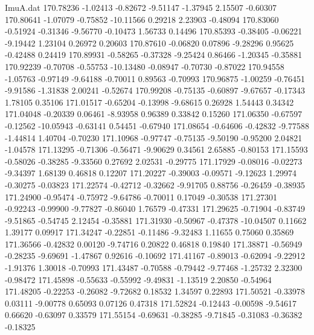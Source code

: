\begin{filecontents}{ImuA.dat}
 170.78236   -1.02413   -0.82672   -9.51147   -1.37945    2.15507   -0.60307
 170.80641   -1.07079   -0.75852  -10.11566    0.29218    2.23903   -0.48094
 170.83060   -0.51924   -0.31346   -9.56770   -0.10473    1.56733    0.14496
 170.85393   -0.38405   -0.06221   -9.19442    1.23104    0.26972    0.20603
 170.87610   -0.06820    0.07896   -9.28296    0.95625   -0.42488    0.24419
 170.89931   -0.58265   -0.37328   -9.25424    0.86466   -1.20345   -0.35881
 170.92239   -0.70708   -0.55753  -10.13480   -0.08947   -0.70730   -0.87022
 170.94558   -1.05763   -0.97149   -9.64188   -0.70011    0.89563   -0.70993
 170.96875   -1.00259   -0.76451   -9.91586   -1.31838    2.00241   -0.52674
 170.99208   -0.75135   -0.60897   -9.67657   -0.17343    1.78105    0.35106
 171.01517   -0.65204   -0.13998   -9.68615    0.26928    1.54443    0.34342
 171.04048   -0.20339    0.06461   -8.93958    0.96389    0.33842    0.15260
 171.06350   -0.67597   -0.12562  -10.05943   -0.63141    0.54451   -0.67940
 171.08654   -0.64606   -0.42832   -9.77588   -1.44814    1.40704   -0.70230
 171.10968   -0.97747   -0.75135   -9.50190   -0.95200    2.04821   -1.04578
 171.13295   -0.71306   -0.56471   -9.90629    0.34561    2.65885   -0.80153
 171.15593   -0.58026   -0.38285   -9.33560    0.27692    2.02531   -0.29775
 171.17929   -0.08016   -0.02273   -9.34397    1.68139    0.46818    0.12207
 171.20227   -0.39003   -0.09571   -9.12623    1.29974   -0.30275   -0.03823
 171.22574   -0.42712   -0.32662   -9.91705    0.88756   -0.26459   -0.38935
 171.24900   -0.95474   -0.75972   -9.64786   -0.70011    0.17049   -0.30538
 171.27301   -0.92243   -0.99900   -9.77827   -0.86040    1.76579   -0.47331
 171.29625   -0.71904   -0.83749   -9.51865   -0.54745    2.12454   -0.35881
 171.31930   -0.50967   -0.47378  -10.04507    0.11662    1.39177    0.09917
 171.34247   -0.22851   -0.11486   -9.32483    1.11655    0.75060    0.35869
 171.36566   -0.42832    0.00120   -9.74716    0.20822    0.46818    0.19840
 171.38871   -0.56949   -0.28235   -9.69691   -1.47867    0.92616   -0.10692
 171.41167   -0.89013   -0.62094   -9.22912   -1.91376    1.30018   -0.70993
 171.43487   -0.70588   -0.79442   -9.77468   -1.25732    2.32300   -0.98472
 171.45898   -0.55633   -0.55992   -9.49831   -1.13519    2.20850   -0.54964
 171.48205   -0.22253   -0.26082   -9.72682    0.18532    1.34597    0.22893
 171.50521   -0.33978    0.03111   -9.00778    0.65093    0.07126    0.47318
 171.52824   -0.12443   -0.00598   -9.54617    0.66620   -0.63097    0.33579
 171.55154   -0.69631   -0.38285   -9.71845   -0.31083   -0.36382   -0.18325

\end{filecontents}
